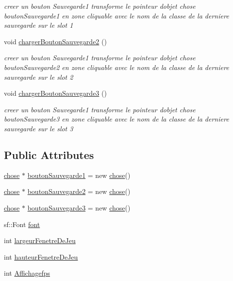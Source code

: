 \begin{DoxyCompactItemize}
\begin{DoxyCompactList}\small\item\em creer un bouton Sauvegarde1 transforme le pointeur d\textquotesingle{}objet chose bouton\+Sauvegarde1 en zone cliquable avec le nom de la classe de la derniere sauvegarde sur le slot 1 \end{DoxyCompactList}\item 
\mbox{\label{classcharger_adfbbcec1cd93c4b06284e8743c79925e}} 
void \mbox{\hyperlink{classcharger_adfbbcec1cd93c4b06284e8743c79925e}{charger\+Bouton\+Sauvegarde2}} ()
\begin{DoxyCompactList}\small\item\em creer un bouton Sauvegarde1 transforme le pointeur d\textquotesingle{}objet chose bouton\+Sauvegarde2 en zone cliquable avec le nom de la classe de la derniere sauvegarde sur le slot 2 \end{DoxyCompactList}\item 
\mbox{\label{classcharger_a4d72ffa3dccbc7b0cca8be8da5d22de6}} 
void \mbox{\hyperlink{classcharger_a4d72ffa3dccbc7b0cca8be8da5d22de6}{charger\+Bouton\+Sauvegarde3}} ()
\begin{DoxyCompactList}\small\item\em creer un bouton Sauvegarde1 transforme le pointeur d\textquotesingle{}objet chose bouton\+Sauvegarde3 en zone cliquable avec le nom de la classe de la derniere sauvegarde sur le slot 3 \end{DoxyCompactList}\end{DoxyCompactItemize}
\subsection*{Public Attributes}
\begin{DoxyCompactItemize}
\item 
\mbox{\hyperlink{classchose}{chose}} $\ast$ \mbox{\hyperlink{classcharger_af6c0ada98ee21a7ef16d3ff8aa9d35d6}{bouton\+Sauvegarde1}} = new \mbox{\hyperlink{classchose}{chose}}()
\item 
\mbox{\hyperlink{classchose}{chose}} $\ast$ \mbox{\hyperlink{classcharger_a4e0387e8d34801e59fc10eb9063f0379}{bouton\+Sauvegarde2}} = new \mbox{\hyperlink{classchose}{chose}}()
\item 
\mbox{\hyperlink{classchose}{chose}} $\ast$ \mbox{\hyperlink{classcharger_a8ac0d4c842e02190e452892932107887}{bouton\+Sauvegarde3}} = new \mbox{\hyperlink{classchose}{chose}}()
\item 
sf\+::\+Font \mbox{\hyperlink{classcharger_a170a19058e540e380bd17c9947fb0401}{font}}
\item 
int \mbox{\hyperlink{classcharger_a9778bdc90d1404a3b1af81349fbd8c60}{largeur\+Fenetre\+De\+Jeu}}
\item 
int \mbox{\hyperlink{classcharger_ae16952f21bfdfdf537575ef898993145}{hauteur\+Fenetre\+De\+Jeu}}
\item 
int \mbox{\hyperlink{classcharger_ad6193b2bdf5b389a40406961cd59090f}{Affichagefps}}
\end{DoxyCompactItemize}


